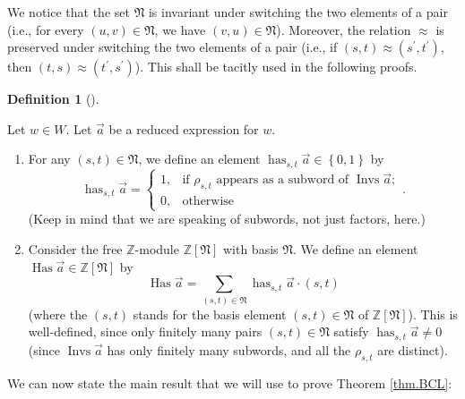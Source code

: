 \documentclass
[numbers=enddot,12pt,final,onecolumn,notitlepage,abstracton]{scrartcl}%
\theoremstyle{definition}
\newtheorem{defi}[theo]{Definition}
\newenvironment{definition}[1][]
{\begin{defi}[#1]\begin{leftbar}}
{\end{leftbar}\end{defi}}
\let\sumnonlimits\sum
\renewcommand{\sum}{\sumnonlimits\limits}
\begin{document}
We notice that the set $\mathfrak{N}$ is invariant under switching the two
elements of a pair (i.e., for every $\left(  u,v\right)  \in\mathfrak{N}$, we
have $\left(  v,u\right)  \in\mathfrak{N}$). Moreover, the relation $\approx$
is preserved under switching the two elements of a pair (i.e., if $\left(
s,t\right)  \approx\left(  s^{\prime},t^{\prime}\right)  $, then $\left(
t,s\right)  \approx\left(  t^{\prime},s^{\prime}\right)  $). This shall be
tacitly used in the following proofs.

\begin{definition}
\label{def.has}Let $w\in W$. Let $\overrightarrow{a}$ be a reduced expression
for $w$.

\begin{enumerate}
\item[\textbf{(a)}] For any $\left(  s,t\right)  \in\mathfrak{N}$, we define
an element $\operatorname*{has}\nolimits_{s,t}\overrightarrow{a}\in\left\{
0,1\right\}  $ by%
\[
\operatorname*{has}\nolimits_{s,t}\overrightarrow{a}=%
\begin{cases}
1, & \text{if }\rho_{s,t}\text{ appears as a subword of }\operatorname*{Invs}%
\overrightarrow{a};\\
0, & \text{otherwise}%
\end{cases}
.
\]
(Keep in mind that we are speaking of subwords, not just factors, here.)

\item[\textbf{(b)}] Consider the free $\mathbb{Z}$-module $\mathbb{Z}\left[
\mathfrak{N}\right]  $ with basis $\mathfrak{N}$. We define an element
$\operatorname*{Has}\overrightarrow{a}\in\mathbb{Z}\left[  \mathfrak{N}%
\right]  $ by%
\[
\operatorname*{Has}\overrightarrow{a}=\sum_{\left(  s,t\right)  \in
\mathfrak{N}}\operatorname*{has}\nolimits_{s,t}\overrightarrow{a}\cdot\left(
s,t\right)
\]
(where the $\left(  s,t\right)  $ stands for the basis element $\left(
s,t\right)  \in\mathfrak{N}$ of $\mathbb{Z}\left[  \mathfrak{N}\right]  $).
This is well-defined, since only finitely many pairs $\left(  s,t\right)
\in\mathfrak{N}$ satisfy $\operatorname*{has}\nolimits_{s,t}\overrightarrow{a}%
\neq0$ (since $\operatorname*{Invs}\overrightarrow{a}$ has only finitely many
subwords, and all the $\rho_{s,t}$ are distinct).
\end{enumerate}
\end{definition}

We can now state the main result that we will use to prove Theorem
\ref{thm.BCL}:
\end{document}
